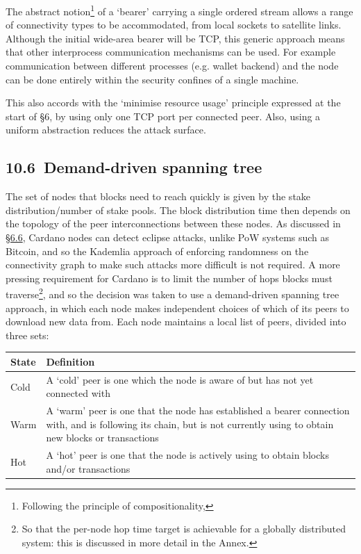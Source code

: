 \documentclass[11pt,a4paper]{article}
\begin{document}
The abstract notion\footnote{Following the principle of
  compositionality,} of a `bearer' carrying a single ordered stream
allows a range of connectivity types to be accommodated, from local
sockets to satellite links. Although the initial wide-area bearer will
be TCP, this generic approach means that other interprocess
communication mechanisms can be used. For example communication between
different processes (e.g. wallet backend) and the node can be done
entirely within the security confines of a single machine.

This also accords with the `minimise resource usage' principle expressed
at the start of §6, by using only one TCP port per connected peer. Also,
using a uniform abstraction reduces the attack surface.

\hypertarget{demand-driven-spanning-tree}{%
\subsection{​10.6​~Demand-driven spanning
tree}\label{demand-driven-spanning-tree}}

The set of nodes that blocks need to reach quickly is given by the stake
distribution/number of stake pools. The block distribution time then
depends on the topology of the peer interconnections between these
nodes. As discussed in
\protect\hyperlink{decentralisation-constraints}{{§6.6}}, Cardano nodes
can detect eclipse attacks, unlike PoW systems such as Bitcoin, and so
the Kademlia approach of enforcing randomness on the connectivity graph
to make such attacks more difficult is not required. A more pressing
requirement for Cardano is to limit the number of hops blocks must
traverse\footnote{So that the per-node hop time target is achievable for
  a globally distributed system: this is discussed in more detail in the
  Annex.}, and so the decision was taken to use a demand-driven spanning
tree approach, in which each node makes independent choices of which of
its peers to download new data from. Each node maintains a local list of
peers, divided into three sets:

\begin{longtable}[]{@{}ll@{}}
\toprule
\textbf{State} & \textbf{Definition}\tabularnewline
\midrule
\endhead
Cold & A `cold' peer is one which the node is aware of but has not yet
connected with\tabularnewline
Warm & A `warm' peer is one that the node has established a bearer
connection with, and is following its chain, but is not currently using
to obtain new blocks or transactions\tabularnewline
Hot & A `hot' peer is one that the node is actively using to obtain
blocks and/or transactions\tabularnewline
\bottomrule
\end{longtable}
\end{document}
